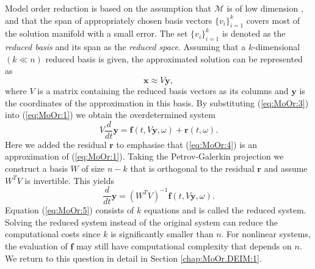 Model order reduction is based on the assumption that $\mathcal M$ is of low dimension \cite{Anonymous:2016wl,Antoulas:2005:ALD:1088857}, and that the span of appropriately chosen basis vectors $\{v_i\}_{i=1}^k$ covers most of the solution manifold with a small error. The set $\{v_i\}_{i=1}^k$ is denoted as the \emph{reduced basis} and its span as the \emph{reduced space}. Assuming that a $k$-dimensional $(k\ll n)$ reduced basis is given, the approximated solution can be represented as
\begin{equation} \label{eq:MoOr:3}
	\mathbf x \approx V \mathbf y,
\end{equation}
where $V$ is a matrix containing the reduced basis vectors as its columns and $\mathbf y$ is the coordinates of the approximation in this basis. By substituting (\ref{eq:MoOr:3}) into (\ref{eq:MoOr:1}) we obtain the overdetermined system
\begin{equation} \label{eq:MoOr:4}
	V \frac{d}{dt} \mathbf y = \mathbf f (t , V \mathbf y , \omega) + \mathbf r(t,\omega).
\end{equation}
Here we added the residual $\mathbf r$ to emphasise that (\ref{eq:MoOr:4}) is an approximation of (\ref{eq:MoOr:1}). Taking the Petrov-Galerkin projection \cite{Antoulas:2005:ALD:1088857} we construct a basis $W$ of size $n-k$ that is orthogonal to the residual $\mathbf r$ and assume $W^T V$ is invertible. This yields
\begin{equation} \label{eq:MoOr:5}
	\frac{d}{dt} \mathbf y = (W^TV)^{-1} \mathbf f(t,V\mathbf y,\omega).
\end{equation}
Equation (\ref{eq:MoOr:5}) consists of $k$ equations and is called the reduced system. Solving the reduced system instead of the original system can reduce the computational costs since $k$ is significantly smaller than $n$. For nonlinear systems, the evaluation of $\mathbf f$ may still have computational complexity that depends on $n$. We return to this question in detail in Section \ref{chap:MoOr.DEIM:1}.

